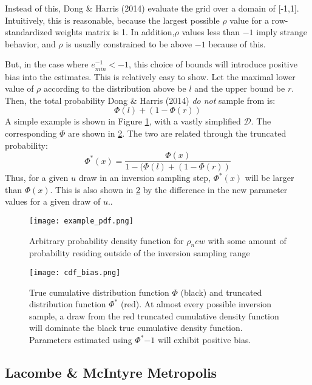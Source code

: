 \documentclass{article}
\begin{document}
Instead of this, Dong \& Harris (2014) evaluate the grid over a domain of
[-1,1].  Intuitively, this is reasonable, because the largest possible $\rho$
value for a row-standardized weights matrix is 1. In addition,$\rho$ values less
than $-1$ imply strange behavior, and $\rho$ is usually constrained to be above
$-1$ because of this.

But, in the case where $e^{-1}_{min} < -1$, this choice of bounds will introduce
positive bias into the estimates. This is relatively easy to show. Let the
maximal lower value of $\rho$ according to the distribution above be $l$ and the
upper bound be $r$. Then, the total probability Dong \& Harris (2014) \textit{do
not} sample from is: 
\[ \Phi(l) + (1 - \Phi(r)) \]
A simple example is shown in Figure \ref{fig:pdf}, with a vastly simplified
$\mathcal{D}$. The corresponding $\Phi$ are shown in \ref{fig:cdf}. The two are
related through the truncated probability:
\[ \Phi^*(x) = \frac{\Phi(x)}{1 - (\Phi(l) + (1 - \Phi(r))} \]
Thus, for a given $u$ draw in an inversion sampling step, $\Phi^*(x)$ will be
larger than $\Phi(x)$. This is also shown in \ref{fig:cdf} by the difference in
the new parameter values for a given draw of $u$..
\begin{figure}
  \centering
  \texttt{[image: example\_pdf.png]}
  \caption{Arbitrary probability density function for $\rho_new$ with some
  amount of probability residing outside of the inversion sampling range}
  \label{fig:pdf}
\end{figure}

\begin{figure}
  \centering
  \texttt{[image: cdf\_bias.png]}
  \caption{True cumulative distribution function $\Phi$ (black) and truncated distribution
  function $\Phi^*$ (red). At almost every possible inversion sample, a draw from the red truncated
  cumulative density function will dominate the black true cumulative density
  function. Parameters estimated using $\Phi^*{-1}$ will exhibit positive bias.}
  \label{fig:cdf}
\end{figure}

\subsection{Lacombe \& McIntyre Metropolis} 
\end{document}

